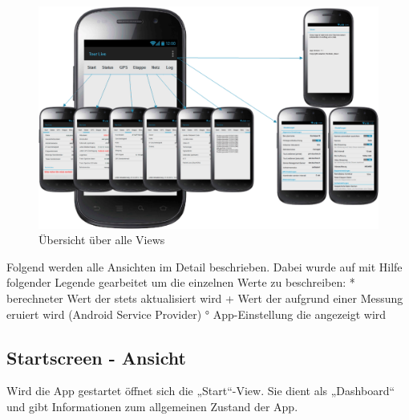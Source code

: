 \begin{figure}[H]
	\centering\includegraphics[width=150mm]{images/android/OverviewAndroid.png} 
	\caption{Übersicht über alle Views}
\end{figure}
 
Folgend werden alle Ansichten im Detail beschrieben. Dabei wurde auf mit Hilfe folgender Legende gearbeitet um die einzelnen Werte zu beschreiben:
* 	berechneter Wert der stets aktualisiert wird
+	Wert der aufgrund einer Messung eruiert wird (Android Service Provider)
°	App-Einstellung die angezeigt wird

\subsection{Startscreen - Ansicht}
Wird die App gestartet öffnet sich die „Start“-View. Sie dient als „Dashboard“ und gibt Informationen zum allgemeinen Zustand der App. 

